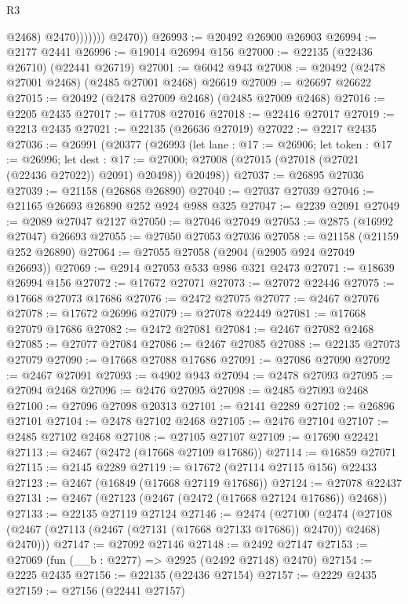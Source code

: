 \begin{lexlean}{R3}
\begin{coremodule}
                        @2468)
                      @2470)))))))
        @2470))
@26993 := @20492 @26900 @26903
@26994 := @2177 @2441
@26996 := @19014 @26994 @156
@27000 := @22135 (@22436 @26710) (@22441 @26719)
@27001 := @6042 @943
@27008 := @20492 (@2478 @27001 @2468) (@2485 @27001 @2468) @26619
@27009 := @26697 @26622
@27015 := @20492 (@2478 @27009 @2468) (@2485 @27009 @2468)
@27016 := @2205 @2435
@27017 := @17708 @27016
@27018 := @22416 @27017
@27019 := @2213 @2435
@27021 := @22135 (@26636 @27019)
@27022 := @2217 @2435
@27036 := @26991
    (@20377
      (@26993
        (let lane : @17 := @26906;
        let token : @17 := @26996;
        let dest : @17 := @27000; @27008 (@27015 (@27018 (@27021 (@22436 @27022)) @2091) @20498))
        @20498))
@27037 := @26895 @27036
@27039 := @21158 (@26868 @26890)
@27040 := @27037 @27039
@27046 := @21165 @26693 @26890 @252 @924 @988 @325
@27047 := @2239 @2091
@27049 := @2089 @27047 @2127
@27050 := @27046 @27049
@27053 := @2875 (@16992 @27047) @26693
@27055 := @27050 @27053 @27036
@27058 := @21158 (@21159 @252 @26890)
@27064 := @27055 @27058 (@2904 (@2905 @924 @27049 @26693))
@27069 := @2914 @27053 @533 @986 @321 @2473
@27071 := @18639 @26994 @156
@27072 := @17672 @27071
@27073 := @27072 @22446
@27075 := @17668 @27073 @17686
@27076 := @2472 @27075
@27077 := @2467 @27076
@27078 := @17672 @26996
@27079 := @27078 @22449
@27081 := @17668 @27079 @17686
@27082 := @2472 @27081
@27084 := @2467 @27082 @2468
@27085 := @27077 @27084
@27086 := @2467 @27085
@27088 := @22135 @27073 @27079
@27090 := @17668 @27088 @17686
@27091 := @27086 @27090
@27092 := @2467 @27091
@27093 := @4902 @943
@27094 := @2478 @27093
@27095 := @27094 @2468
@27096 := @2476 @27095
@27098 := @2485 @27093 @2468
@27100 := @27096 @27098 @20313
@27101 := @2141 @2289
@27102 := @26896 @27101
@27104 := @2478 @27102 @2468
@27105 := @2476 @27104
@27107 := @2485 @27102 @2468
@27108 := @27105 @27107
@27109 := @17690 @22421
@27113 := @2467 (@2472 (@17668 @27109 @17686))
@27114 := @16859 @27071
@27115 := @2145 @2289
@27119 := @17672 (@27114 @27115 @156) @22433
@27123 := @2467 (@16849 (@17668 @27119 @17686))
@27124 := @27078 @22437
@27131 := @2467 (@27123 (@2467 (@2472 (@17668 @27124 @17686)) @2468))
@27133 := @22135 @27119 @27124
@27146 := @2474
    (@27100
      (@2474 (@27108 (@2467 (@27113 (@2467 (@27131 (@17668 @27133 @17686)) @2470)) @2468) @2470)))
@27147 := @27092 @27146
@27148 := @2492 @27147
@27153 := @27069 (fun (__b : @2277) => @2925 (@2492 @27148) @2470)
@27154 := @2225 @2435
@27156 := @22135 (@22436 @27154)
@27157 := @2229 @2435
@27159 := @27156 (@22441 @27157)

\end{coremodule}
\end{lexlean}
